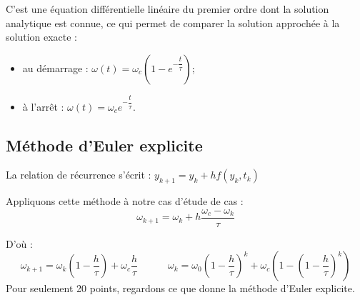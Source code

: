 \documentclass[10pt]{article}
\begin{document}
C’est une équation différentielle linéaire du premier ordre dont la solution analytique est connue, ce qui permet de comparer la solution approchée à la solution exacte :
\begin{itemize}
\item au démarrage : $\omega(t)=\omega_c\left(1-e^{-\dfrac{t}{\tau}}\right)$;
\item à l'arrêt : $\omega(t)=\omega_c e^{-\dfrac{t}{\tau}}$.
\end{itemize}

\subsection{Méthode d'Euler explicite}
\begin{resultat}
La relation de récurrence s’écrit : $y_{k+1}=y_k+hf(y_k,t_k)$
\end{resultat}

Appliquons cette méthode à notre cas d'étude de cas :
$$\omega_{k+1}=\omega_k+h \dfrac{\omega_c-\omega_k}{\tau}$$

D’où :
$$
\omega_{k+1}=\omega_k \left(1-\dfrac{h}{\tau}\right)+\omega_c \dfrac{h}{\tau}
\quad \quad \quad 
\omega_k=\omega_0 \left(1-\dfrac{h}{\tau}\right)^k+\omega_c\left(1-\left(1-\dfrac{h}{\tau}\right)^k \right)
$$
Pour seulement 20 points, regardons ce que donne la méthode d’Euler explicite.
\end{document}
